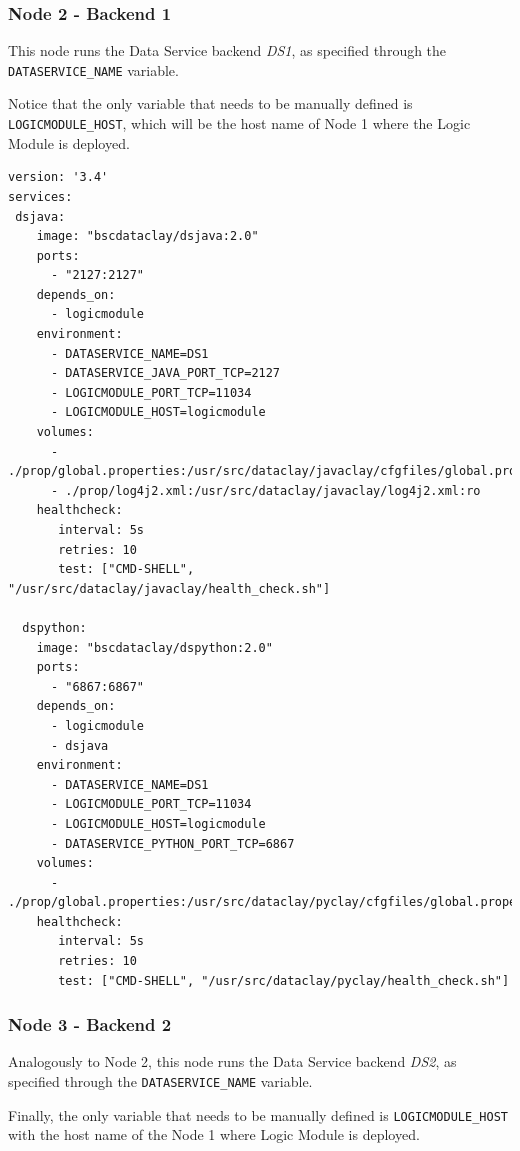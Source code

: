 \subsubsection{Node 2 - Backend 1}

This node runs the Data Service backend \textit{DS1}, as specified through the \texttt{DATASERVICE\_NAME} variable.

Notice that the only variable that needs to be manually defined is \texttt{LOGICMODULE\_HOST}, which will be the host name of Node 1 where the Logic Module is deployed.

\begin{tBox}
 \begin{lstlisting}[language=docker-compose-2, frame=none]
version: '3.4'
services:
 dsjava:
    image: "bscdataclay/dsjava:2.0"
    ports:
      - "2127:2127"
    depends_on:
      - logicmodule
    environment:
      - DATASERVICE_NAME=DS1
      - DATASERVICE_JAVA_PORT_TCP=2127
      - LOGICMODULE_PORT_TCP=11034
      - LOGICMODULE_HOST=logicmodule
    volumes:
      - ./prop/global.properties:/usr/src/dataclay/javaclay/cfgfiles/global.properties:ro
      - ./prop/log4j2.xml:/usr/src/dataclay/javaclay/log4j2.xml:ro
    healthcheck:
       interval: 5s
       retries: 10
       test: ["CMD-SHELL", "/usr/src/dataclay/javaclay/health_check.sh"]
       
  dspython:
    image: "bscdataclay/dspython:2.0"
    ports:
      - "6867:6867"
    depends_on:
      - logicmodule
      - dsjava
    environment:
      - DATASERVICE_NAME=DS1
      - LOGICMODULE_PORT_TCP=11034
      - LOGICMODULE_HOST=logicmodule
      - DATASERVICE_PYTHON_PORT_TCP=6867
    volumes:
      - ./prop/global.properties:/usr/src/dataclay/pyclay/cfgfiles/global.properties:ro
    healthcheck:
       interval: 5s
       retries: 10
       test: ["CMD-SHELL", "/usr/src/dataclay/pyclay/health_check.sh"]
 \end{lstlisting}
\end{tBox}

\subsubsection{Node 3 - Backend 2}

Analogously to Node 2, this node runs the Data Service backend \textit{DS2}, as specified through the \texttt{DATASERVICE\_NAME} variable.

Finally, the only variable that needs to be manually defined is \texttt{LOGICMODULE\_HOST} with the host name of the Node 1 where Logic Module is deployed.


